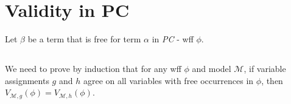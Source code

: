 \documentclass{article}
\begin{document}
    \section{Validity in PC}

    Let $\beta$ be a term that is free for term $\alpha$ in \textit{PC} - wff $\phi$.

    \subsection{}
    
    We need to prove by induction that for any wff $\phi$ and model $\mathscr{M}$, 
    if variable assignments $g$ and $h$ agree on all variables with free occurrences in $\phi$, then $V_{\mathscr{M} , g}(\phi) = V_{\mathscr{M}, h}(\phi)$. 
    
\end{document}
